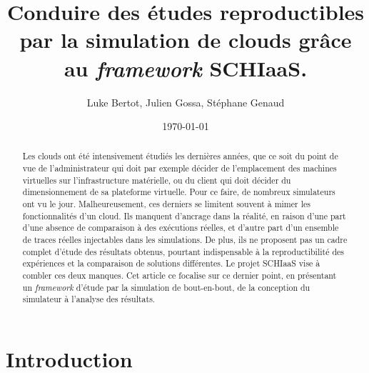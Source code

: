 \documentclass[parallelisme]{compas2017}
\begin{document}
\title{Conduire des études reproductibles par la simulation de clouds grâce au 
\textit{framework} SCHIaaS.}

\author{Luke Bertot, Julien Gossa, Stéphane Genaud}%

\address{Université De Strasbourg,\\
Laboratoire ICube - Pôle API - 300 Bd Sébastien Brant\\
67400 Illkirch-Graffenstaden - France\\
lbertot@unistra.fr gossa@unistra.fr genaud@unistra.fr }

\date{\today}

\maketitle

\begin{abstract}

Les clouds ont été intensivement étudiés les dernières années, que ce soit du 
point de vue de l'administrateur qui doit par exemple décider de l'emplacement
des machines virtuelles sur l'infrastructure matérielle, ou du client qui doit 
décider du dimensionnement de sa plateforme virtuelle. Pour ce faire, de 
nombreux
simulateurs ont vu le jour. Malheureusement, ces derniers se limitent souvent à 
mimer les fonctionnalités d'un cloud. Ils manquent d'ancrage dans la 
réalité, en raison d'une part d'une absence de comparaison à des exécutions réelles, 
et d'autre part d'un ensemble de traces réelles injectables dans les 
simulations. De plus, ils ne proposent pas un cadre complet d'étude
des résultats obtenus, pourtant indispensable à la reproductibilité des 
expériences et la comparaison de solutions différentes.
Le projet SCHIaaS vise à combler ces deux manques. Cet article ce focalise sur 
ce dernier point, en présentant un \textit{framework} d'étude par la 
simulation de bout-en-bout, de la conception du simulateur à l'analyse des 
résultats.

\end{abstract}


\section{Introduction}
\end{document}
